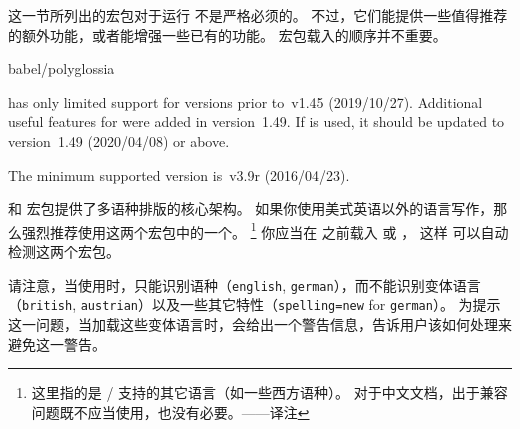 这一节所列出的宏包对于运行 \biblatex 不是严格必须的。
不过，它们能提供一些值得推荐的额外功能，或者能增强一些已有的功能。
宏包载入的顺序并不重要。

\begin{marglist}

\item[babel/polyglossia]


\biblatex has only limited support for  versions prior to~v1.45 (2019/10/27). Additional useful features for \biblatex were added in version~1.49. If  is used, it should be updated to version~1.49 (2020/04/08) or above.

The minimum supported  version is~v3.9r (2016/04/23).


 和  宏包提供了多语种排版的核心架构。
如果你使用美式英语以外的语言写作，那么强烈推荐使用这两个宏包中的一个。
\footnote{
这里指的是 / 支持的其它语言（如一些西方语种）。
对于中文文档，出于兼容问题既不应当使用，也没有必要。——译注}
你应当在 \biblatex 之前载入  或 ，
这样 \biblatex 可以自动检测这两个宏包。

请注意，当使用时，\biblatex 只能识别语种（\eg \texttt{english}, \texttt{german}），而不能识别变体语言（\eg \texttt{british}, \texttt{austrian}）以及一些其它特性（\eg \texttt{spelling=new} for \texttt{german}）。
为提示这一问题，当加载这些变体语言时，\biblatex 会给出一个警告信息，告诉用户该如何处理来避免这一警告。



\end{marglist}
